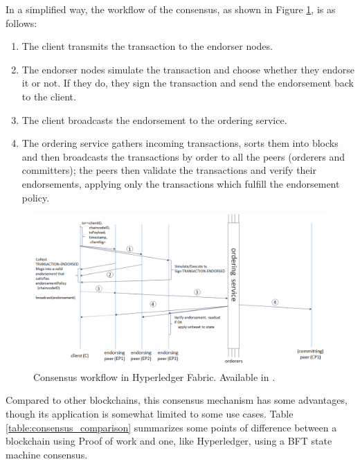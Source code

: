 In a simplified way, the workflow of the consensus, as shown in Figure \ref{fig:fabric_workflow},  is as follows:
\begin{enumerate}
\item The client transmits the transaction to the endorser nodes.
\item The endorser nodes simulate the transaction and choose whether they endorse it or not. If they do, they sign the transaction and send the endorsement back to the client.
\item The client broadcasts the endorsement to the ordering service.
\item The ordering service gathers incoming transactions, sorts them into blocks and then broadcasts the transactions by order to all the peers (orderers and committers); the peers then validate the transactions and verify their endorsements, applying only the transactions which fulfill the endorsement policy.
\end{enumerate}
\begin{figure}[h]
\centering
\includegraphics[scale=0.5]{media/fabric_workflow.png}
\caption[Consensus workflow in Hyperledger Fabric]{Consensus workflow in Hyperledger Fabric. Available in \cite{IBMResearch2017}.}
\label{fig:fabric_workflow}
\end{figure}

Compared to other blockchains, this consensus mechanism has some advantages, though its application is somewhat limited to some use cases. Table \ref{table:consensus_comparison} summarizes some points of difference between a blockchain using Proof of work and one, like Hyperledger, using a BFT state machine consensus.




